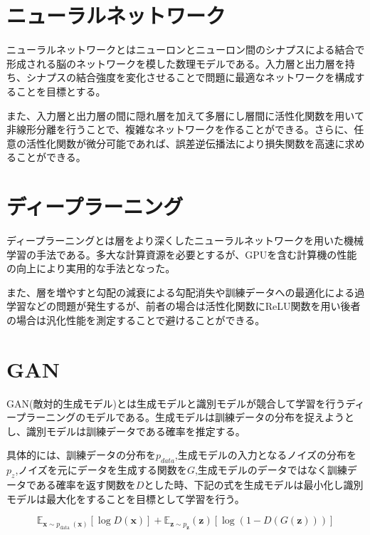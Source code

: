 \section{ニューラルネットワーク}
ニューラルネットワークとはニューロンとニューロン間のシナプスによる結合で形成される脳のネットワークを模した数理モデルである。入力層と出力層を持ち、シナプスの結合強度を変化させることで問題に最適なネットワークを構成することを目標とする。\par
また、入力層と出力層の間に隠れ層を加えて多層にし層間に活性化関数を用いて非線形分離を行うことで、複雑なネットワークを作ることができる。さらに、任意の活性化関数が微分可能であれば、誤差逆伝播法により損失関数を高速に求めることができる。\par


\section{ディープラーニング}

ディープラーニングとは層をより深くしたニューラルネットワークを用いた機械学習の手法である。多大な計算資源を必要とするが、GPUを含む計算機の性能の向上により実用的な手法となった。\par
また、層を増やすと勾配の減衰による勾配消失や訓練データへの最適化による過学習などの問題が発生するが、前者の場合は活性化関数にReLU関数を用い後者の場合は汎化性能を測定することで避けることができる。\par


\section{GAN}

GAN(敵対的生成モデル)とは生成モデルと識別モデルが競合して学習を行うディープラーニングのモデルである。生成モデルは訓練データの分布を捉えようとし、識別モデルは訓練データである確率を推定する。\par
具体的には、訓練データの分布を$p_{data}$,生成モデルの入力となるノイズの分布を$p_z$,ノイズを元にデータを生成する関数を$G$,生成モデルのデータではなく訓練データである確率を返す関数を$D$とした時、下記の式を生成モデルは最小化し識別モデルは最大化をすることを目標として学習を行う\cite{GAN}。

$$
\mathbb{E}_{\boldsymbol{x} \sim p_{\text {data }}(\boldsymbol{x})}[\log D(\boldsymbol{x})]+\mathbb{E}_{\boldsymbol{z} \sim p_{\boldsymbol{z}}}(\boldsymbol{z})[\log (1-D(G(\boldsymbol{z})))]
$$

